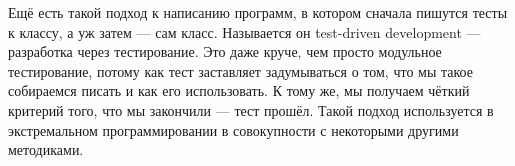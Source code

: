 \documentclass{../../text-style}
\begin{document}
Ещё есть такой подход к написанию программ, в котором сначала пишутся тесты к классу, а уж затем --- сам класс. Называется он test-driven development --- разработка через тестирование. Это даже круче, чем просто модульное тестирование, потому как тест заставляет задумываться о том, что мы такое собираемся писать и как его использовать. К тому же, мы получаем чёткий критерий того, что мы закончили --- тест прошёл. Такой подход используется в экстремальном программировании в совокупности с некоторыми другими методиками.
\end{document}
